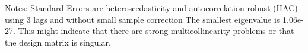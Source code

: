 Notes: \newline
 [1] Standard Errors are heteroscedasticity and autocorrelation robust (HAC) using 3 lags and without small sample correction \newline
 [2] The smallest eigenvalue is 1.06e-27. This might indicate that there are \newline
 strong multicollinearity problems or that the design matrix is singular.